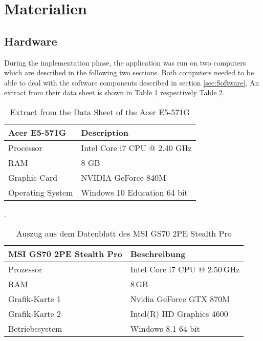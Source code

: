 
\section{Materialien}\label{sec:Materials}

\subsection{Hardware}\label{sec:Hardware}

During the implementation phase, the application was run on two computers which are described in the following two sections. Both computers needed to be able to deal with the software components described in section \ref{sec:Software}. An extract from their data sheet is shown in Table \ref{tab:Computer1} respectively Table \ref{tab:Computer2}.


\begin{table}[H]
	\centering
	\begin{tabular}{|l|l|}
		\hline
		\Absatzbox{}
		\textbf{Acer E5-571G}& \textbf{Description} \\
		\hline
		Processor & Intel Core i7 CPU @ 2.40 GHz\\
		\hline
		RAM & 8 GB  \\
		\hline 
		Graphic Card & NVIDIA GeForce 840M\\
		\hline
		Operating System &  Windows 10 Education 64 bit   \\
		\hline
	\end{tabular}
	\caption[Extract from the Data Sheet of the Acer E5-571G]{Extract from the Data Sheet of the Acer E5-571G}.
	\label{tab:Computer1}
\end{table}

\begin{table}[H]
	\centering
	\begin{tabular}{|l|l|}
		\hline
		\Absatzbox{}
		\textbf{MSI GS70 2PE Stealth Pro}& \textbf{Beschreibung} \\
		\hline
		Prozessor & Intel Core i7 CPU @ $2.50\,$GHz \\
		\hline
		RAM & $8\,$GB \\
		\hline 
		Grafik-Karte 1 & Nvidia GeForce GTX 870M\\
		\hline
		Grafik-Karte 2 & Intel(R) HD Graphics 4600\\
		\hline
		Betriebssystem & Windows 8.1 64 bit \\
		\hline
	\end{tabular}
	\caption[Auszug aus dem Datenblatt des MSI GS70 2PE Stealth Pro]{Auszug aus dem Datenblatt des MSI GS70 2PE Stealth Pro}
	\label{tab:Computer2}
\end{table}


